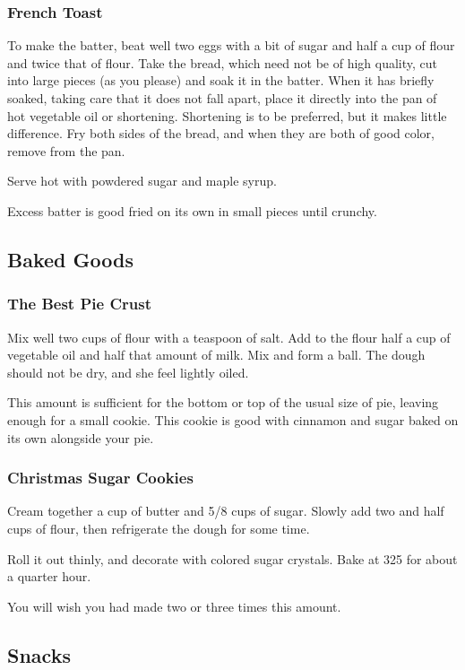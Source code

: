 \documentclass[10pt]{article}
\begin{document}
\subsubsection*{French Toast}

To make the batter, beat well two eggs with a bit of sugar and half a cup of flour and twice that of flour.
Take the bread, which need not be of high quality, cut into large pieces (as you please) and soak it in the batter.
When it has briefly soaked, taking care that it does not fall apart, place it directly into the pan of hot vegetable oil or shortening.
Shortening is to be preferred, but it makes little difference.
Fry both sides of the bread, and when they are both of good color, remove from the pan.

Serve hot with powdered sugar and maple syrup.

Excess batter is good fried on its own in small pieces until crunchy.

\subsection*{Baked Goods}

\subsubsection*{The Best Pie Crust}

Mix well two cups of flour with a teaspoon of salt.
Add to the flour half a cup of vegetable oil and half that amount of milk.
Mix and form a ball.
The dough should not be dry, and she feel lightly oiled.

This amount is sufficient for the bottom or top of the usual size of pie, leaving enough for a small cookie.
This cookie is good with cinnamon and sugar baked on its own alongside your pie.

\subsubsection*{Christmas Sugar Cookies}

Cream together a cup of butter and 5/8 cups of sugar.
Slowly add two and half cups of flour, then refrigerate the dough for some time.

Roll it out thinly, and decorate with colored sugar crystals.
Bake at 325 for about a quarter hour.

You will wish you had made two or three times this amount.

\subsection*{Snacks}
\end{document}
